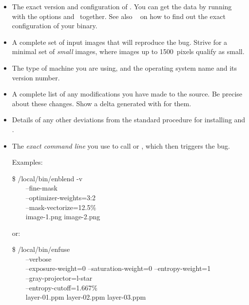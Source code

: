 \begin{itemize}
\item
  The exact version and configuration of \App.  You can get the data by running \app{} with the
  options  and~ together.  See also
  \sectionName~ on how to find out the exact configuration of
  your binary.

\item
  A complete set of input images that will reproduce the bug.  Strive for a minimal set of
  \emph{small} images, where images up to 1500~pixels qualify as small.

\item
  The type of machine you are using, and the operating system name and its version number.

\item
  A complete list of any modifications you have made to the source.  Be precise about these
  changes.  Show a delta generated with  for them.

\item
  Details of any other deviations from the standard procedure for installing \App{} and
  \OtherApp{}.

\item
  The \emph{exact command line} you use to call \App{} or \OtherApp{}, which then triggers the
  bug.

  Examples:

  \begin{terminal}
    \$ \squiggle/local/bin/enblend -v \bslash \\
    ~~~~--fine-mask \bslash \\
    ~~~~--optimizer-weights=3:2 \bslash \\
    ~~~~--mask-vectorize=12.5\% \bslash \\
    ~~~~image-1.png image-2.png
  \end{terminal}

  or:

  \begin{terminal}
    \$ /local/bin/enfuse \bslash \\
    ~~~~--verbose \bslash \\
    ~~~~--exposure-weight=0 --saturation-weight=0 --entropy-weight=1 \bslash \\
    ~~~~--gray-projector=l-star \bslash \\
    ~~~~--entropy-cutoff=1.667\% \bslash \\
    ~~~~layer-01.ppm layer-02.ppm layer-03.ppm
  \end{terminal}


\end{itemize}
